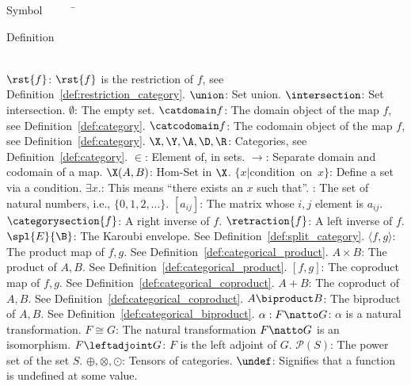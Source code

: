 


\begin{tabbing}
Symbol~~~~~\= \ \ \ \ \ \ \ \ \ \ \ \ \ \ \ \ \ \ \ \ \ \ \ \ \ \ \ \ \ \ \ \ \ \ \ \  \parbox{5in}{Definition}\\

\addsymbol \mbox{$\rst{f}$}: {$\rst{f}$ is the restriction of $f$, see Definition~\ref{def:restriction_category}.}
\addsymbol \mbox{$\union$}: {Set union.}
\addsymbol \mbox{$\intersection$}: {Set intersection.}
\addsymbol \mbox{$\emptyset$}: {The empty set.}
\addsymbol \mbox{$\catdomain f$}: {The domain object of the map $f$, see Definition~\ref{def:category}.}
\addsymbol \mbox{$\catcodomain f$}: {The codomain object of the map $f$, see Definition~\ref{def:category}.}
\addsymbol \mbox{$\X,\Y, \A,\D,\R$}: {Categories, see Definition~\ref{def:category}.}
\addsymbol \mbox{$\in$}: {Element of, in sets.}
\addsymbol \mbox{$\to$}: {Separate domain and codomain of a map.}
\addsymbol \mbox{$\X(A,B)$}: {Hom-Set in $\X$.}
\addsymbol \mbox{$\{x | $condition on $x\}$}: {Define a set via a condition.}
\addsymbol \mbox{$\exists x.$}: {This means ``there exists an $x$ such that''.}
\addsymbol \mbox{\nat}: {The set of natural numbers, i.e., $\{0,1,2,\ldots\}$.}
\addsymbol \mbox{$[a_{i j}]$}: {The matrix whose $i,j$ element is $a_{i j}$.}
\addsymbol \mbox{$\categorysection{f}$}: {A right inverse of $f$.}
\addsymbol \mbox{$\retraction{f}$}: {A left inverse of $f$.}
\addsymbol \mbox{$\spl{E}{\B}$}: {The Karoubi envelope. See  Definition~\ref{def:split_category}.}
\addsymbol \mbox{$\langle f,g\rangle$}: {The product map of $f,g$. See Definition~\ref{def:categorical_product}.}
\addsymbol \mbox{$A\times B$}: {The product of $A,B$. See Definition~\ref{def:categorical_product}.}
\addsymbol \mbox{$[f,g]$}: {The coproduct map of $f,g$. See Definition~\ref{def:categorical_coproduct}.}
\addsymbol \mbox{$A+B$}: {The coproduct of $A,B$. See Definition~\ref{def:categorical_coproduct}.}
\addsymbol \mbox{$A\biproduct B$}: {The biproduct of $A,B$. See Definition~\ref{def:categorical_biproduct}.}
\addsymbol \mbox{$\alpha: F\natto G$}: {$\alpha$ is a natural transformation.}
\addsymbol \mbox{$F\cong G$}: {The natural transformation $F\natto G$ is an isomorphism.}
\addsymbol \mbox{$F\leftadjoint G$}: {$F$ is the left adjoint of $G$.}
\addsymbol \mbox{$\mathcal{P}(S)$}: {The power set of the set $S$.}
\addsymbol \mbox{$\oplus,\otimes,\odot$}: {Tensors of categories.}
\addsymbol \mbox{$\undef$}: {Signifies that a function is undefined at some value.}

\end{tabbing}
